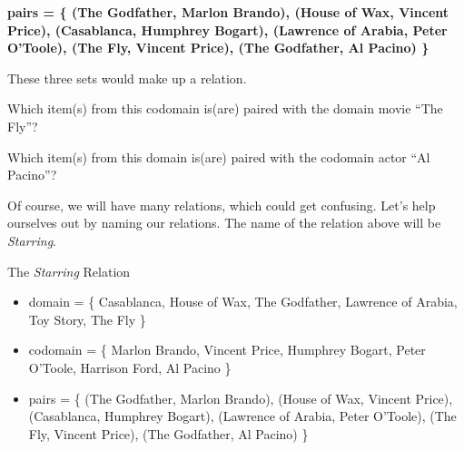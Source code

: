 \documentclass{ximera}
\begin{document}
\begin{center} 
\textbf{\textcolor{blue!75!black}{ pairs = \{ (The Godfather, Marlon Brando), (House of Wax, Vincent Price), (Casablanca, Humphrey Bogart), (Lawrence of Arabia, Peter O'Toole), (The Fly, Vincent Price), (The Godfather, Al Pacino) \}  }}
\end{center}


These three sets would make up a relation. 



\begin{question}

Which item(s) from this codomain is(are) paired with the domain movie ``The Fly''?
\begin{selectAll}
\end{selectAll}

\end{question}



\begin{question}

Which item(s) from this domain is(are) paired with the codomain actor ``Al Pacino''?
\begin{selectAll}
\end{selectAll}

\end{question}






Of course, we will have many relations, which could get confusing.  Let's help ourselves out by naming our relations.  The name of the relation above will be \textit{Starring}.


\begin{example} The \textit{Starring} Relation\\
\begin{itemize}
\item domain = \{ Casablanca, House of Wax,  The Godfather, Lawrence of Arabia, Toy Story, The Fly \}  
\item codomain = \{ Marlon Brando, Vincent Price, Humphrey Bogart, Peter O'Toole, Harrison Ford, Al Pacino  \} 
\item pairs = \{ (The Godfather, Marlon Brando), (House of Wax, Vincent Price), (Casablanca, Humphrey Bogart), (Lawrence of Arabia, Peter O'Toole), (The Fly, Vincent Price), (The Godfather, Al Pacino) \} 
\end{itemize}
\end{example}
\end{document}
